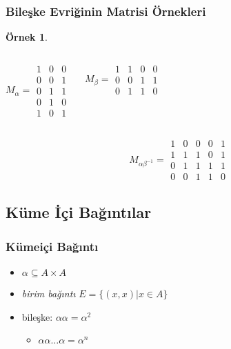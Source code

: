 \documentclass[dvipsnames]{beamer}
\theoremstyle{definition}
\theoremstyle{example}
\newtheorem{ornek}[theorem]{Örnek}
\theoremstyle{plain}
\begin{document}
\begin{frame}
  \frametitle{Bileşke Evriğinin Matrisi Örnekleri}

  \begin{ornek}
    \begin{columns}
      \[ M_\alpha =
        \begin{array}{|ccc|}
          1 & 0 & 0\\
          0 & 0 & 1\\
          0 & 1 & 1\\
          0 & 1 & 0\\
          1 & 0 & 1
        \end{array}
      \]

      \[ M_\beta =
        \begin{array}{|cccc|}
          1 & 1 & 0 & 0\\
          0 & 0 & 1 & 1\\
          0 & 1 & 1 & 0
        \end{array}
      \]
    \end{columns}

    \[ M_{\alpha \beta^{-1}} =
      \begin{array}{|ccccc|}
        1 & 0 & 0 & 0 & 1\\
        1 & 1 & 1 & 0 & 1\\
        0 & 1 & 1 & 1 & 1\\
        0 & 0 & 1 & 1 & 0
      \end{array}
    \]
  \end{ornek}
\end{frame}

\subsection{Küme İçi Bağıntılar}

\begin{frame}
  \frametitle{Kümeiçi Bağıntı}

  \begin{itemize}
    \item $\alpha \subseteq A \times A$

    \pause
    \medskip
    \item \emph{birim bağıntı} $E = \{(x,x) | x \in A\}$

    \pause
    \medskip
    \item bileşke: $\alpha \alpha = \alpha^2$
    \begin{itemize}
      \item $\alpha \alpha \dots \alpha = \alpha^n$
    \end{itemize}
  \end{itemize}
\end{frame}
\end{document}
